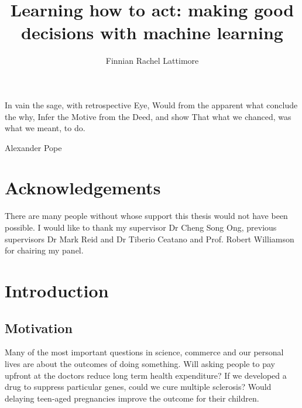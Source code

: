 \documentclass[11pt,a4paper,twoside]{report}
\author{Finnian Rachel Lattimore}
\title{Learning how to act: making good decisions with machine learning}
\theoremstyle{plain}
\theoremstyle{definition}
\newcommand{\ci}{\mathrel{\perp\mspace{-10mu}\perp}}
\begin{document}




\epigraph{In vain the sage, with retrospective Eye,
Would from the apparent what conclude the why,
Infer the Motive from the Deed, and show
That what we chanced, was what we meant, to do.}{Alexander Pope}

\chapter*{Acknowledgements}

There are many people without whose support this thesis would not have been possible. I would like to thank my supervisor Dr Cheng Song Ong, previous supervisors Dr Mark Reid and Dr Tiberio Ceatano and Prof. Robert Williamson for chairing my panel.   








\onehalfspacing
 







\tableofcontents


\chapter{Introduction}

\section{Motivation}
Many of the most important questions in science, commerce and our personal lives are about the outcomes of doing something. Will asking people to pay upfront at the doctors reduce long term health expenditure? If we developed a drug to suppress particular genes, could we cure multiple sclerosis? Would delaying teen-aged pregnancies improve the outcome for their children.  
\end{document}

